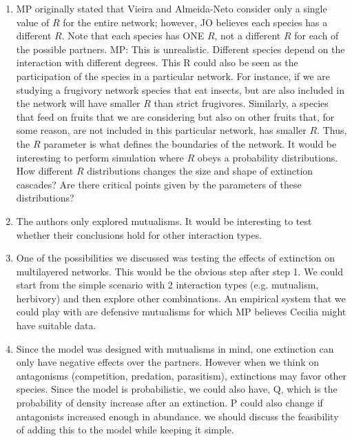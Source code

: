 \documentclass[12pt]{article}
\begin{document}
\begin{enumerate}

	\item MP originally stated that Vieira and Almeida-Neto consider only a single value of $R$ for the entire network; however, JO believes each species has a different $R$. Note that each species has ONE $R$, not a different $R$ for each of the possible partners. MP: This is unrealistic. Different species depend on the interaction with different degrees. This R could also be seen as the participation of the species in a particular network. For instance, if we are studying a frugivory network species that eat insects, but are also included in the network will have smaller $R$ than strict frugivores. Similarly, a species that feed on fruits that we are considering but also on other fruits that, for some reason, are not included in this particular network, has smaller $R$.  Thus, the $R$ parameter is what defines the boundaries of the network. It would be interesting to perform simulation where $R$ obeys a probability distributions. How different $R$ distributions changes the size and shape of extinction cascades? Are there critical points given by the parameters of these distributions?

	\item The authors only explored mutualisms. It would be interesting to test whether their conclusions hold for other interaction types.

	\item One of the possibilities we discussed was testing the effects of extinction on multilayered networks. This would be the obvious step after step 1. We could start from the simple scenario with 2 interaction types (e.g. mutualism, herbivory) and then explore other combinations. An empirical system that we could play with are defensive mutualisms for which MP believes Cecilia might have suitable data.

	\item Since the model was designed with mutualisms in mind, one extinction can only have negative effects over the partners. However when we think on antagonisms (competition, predation, parasitism), extinctions may favor other species. Since the model is probabilistic, we could also have, Q, which is the probability of density increase after an extinction. P could also change if antagonists increased enough in abundance. we should discuss the feasibility of adding this to the model while keeping it simple.

\end{enumerate}
\end{document}
